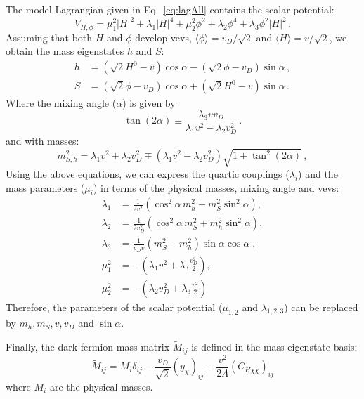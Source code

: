 \documentclass[a4paper,11pt]{article}
\begin{document}
The model Lagrangian given in Eq.~\eqref{eq:lagAll} contains the scalar potential:
\begin{equation}
V_{H,\phi} = \mu_1^2 |H|^2 + \lambda_1 |H|^4  + \mu_{2}^2 \phi^2 + \lambda_2 \phi^4 + \lambda_3 \phi^2 |H|^2 \,.
\end{equation}
Assuming that both $H$ and $\phi$ develop vevs, $\langle \phi \rangle = v_D/\sqrt{2}$ and $\langle H \rangle = v/\sqrt{2}$, we obtain the mass eigenstates $h$ and $S$:
\begin{align}
	h &= (\sqrt{2} H^0 -v) \cos \alpha - (\sqrt{2} \phi-v_D) \sin \alpha \,,  \nonumber\\
	S &= (\sqrt{2} \phi - v_D) \cos \alpha + (\sqrt{2} H^0 - v) \sin \alpha \,. \label{eq:alpha}
\end{align}
Where the mixing angle ($\alpha$) is given by
\begin{equation}
	\tan(2 \alpha) \equiv \frac{\lambda_{3} v v_D}{\lambda_1 v^2-\lambda_2 v_D^2}\,.
	\label{tan}
\end{equation}
and with masses: 
\begin{equation}
m_{S,h}^2 = \lambda_{1} v^2+\lambda_{2} v_D^2 \mp \left(\lambda_{1} v^2-\lambda_{2} v_D^2\right) \sqrt{1 + \tan^2(2 \alpha)}\,,
   \label{mhs}
\end{equation}
Using the above equations, we can express the quartic couplings ($\lambda_i$) and the mass parameters ($\mu_i$) in terms of the physical masses, mixing angle and vevs:  
\begin{align}
 \lambda_1 &=  \frac{1}{2 v^2}\left(\cos^2\alpha\, m_{h}^2+m_{S}^2 \sin^2\alpha\right),\\
 \lambda_2 &= \frac{1}{2 v_D^2} \left(\cos^2\alpha \, m_{S}^2+ m_{h}^2 \sin^2 \alpha\right),\\
  \lambda_{3} &= \frac{1}{v_D v} \left(m_{S}^2 -m_h^2 \right) \sin\alpha \cos\alpha \; ,\\
  \mu_1^2 &=  -\left(\lambda_{1}v^2 + \lambda_{3} \frac{v_D^2}{2} \right), 
  \quad\\
  \mu_2^2 &= -\left(\lambda_{2} v_D^2 + \lambda_{3}\frac{v^2}{2}\right)
\end{align}
Therefore, the parameters of the scalar potential ($\mu_{1,2}$ and $\lambda_{1,2,3}$) can be replaced by $m_{h},m_S,v,v_D$ and $\sin\alpha$.

Finally, the dark fermion mass matrix $\tilde{M}_{ij}$ is defined in the mass eigenstate basis:
\begin{equation*}
	\tilde{M}_{ij} = M_i \delta_{ij} -\frac{v_D}{\sqrt{2}} (y_{\chi})_{ij} - \frac{v^2}{2\Lambda} (C_{H\chi\chi})_{ij}
\end{equation*}
where $M_i$ are the physical masses.
\end{document}
